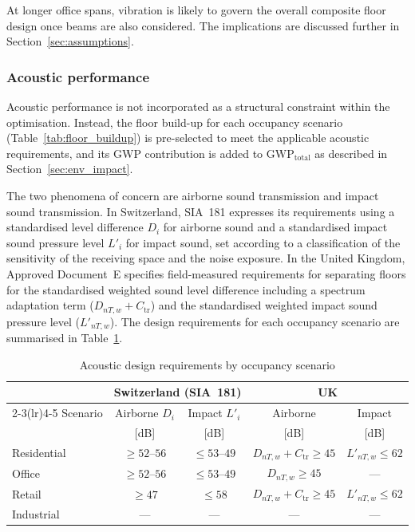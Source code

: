 At longer office spans, vibration is likely to govern the overall composite floor design once beams are also considered. The implications are discussed further in Section~\ref{sec:assumptions}.

\subsubsection*{Acoustic performance}
\label{sec:acoustic}

Acoustic performance is not incorporated as a structural constraint within the optimisation. Instead, the floor build-up for each occupancy scenario (Table~\ref{tab:floor_buildup}) is pre-selected to meet the applicable acoustic requirements, and its GWP contribution is added to $\mathrm{GWP}_\mathrm{total}$ as described in Section~\ref{sec:env_impact}.

The two phenomena of concern are airborne sound transmission and impact sound transmission. In Switzerland, SIA~181 \citep{RefWorks:sia181} expresses its requirements using a standardised level difference $D_i$ for airborne sound and a standardised impact sound pressure level $L'_i$ for impact sound, set according to a classification of the sensitivity of the receiving space and the noise exposure.  In the United Kingdom, Approved Document~E \citep{RefWorks:adePartE} specifies field-measured requirements for separating floors for the standardised weighted sound level difference including a spectrum adaptation term ($D_{nT,w}+C_\mathrm{tr}$) and the standardised weighted impact sound pressure level ($L'_{nT,w}$). The design requirements for each occupancy scenario are summarised in Table~\ref{tab:acoustic_requirements}.

\begin{table}[h!]
\small
\centering
\caption{Acoustic design requirements by occupancy scenario}
\label{tab:acoustic_requirements}
\begin{tabular}{lcccc}
\toprule
 & \multicolumn{2}{c}{\textbf{Switzerland (SIA~181)}} & \multicolumn{2}{c}{\textbf{UK}} \\
\cmidrule(lr){2-3}\cmidrule(lr){4-5}
Scenario & Airborne $D_i$ & Impact $L'_i$ & Airborne & Impact \\
         & [dB] & [dB] & [dB] & [dB] \\
\midrule
Residential & $\ge 52$--$56$ & $\le 53$--$49$ & $D_{nT,w}+C_\mathrm{tr} \ge 45$ & $L'_{nT,w} \le 62$ \\
Office      & $\ge 52$--$56$ & $\le 53$--$49$ & $D_{nT,w} \ge 45$               & --- \\
Retail      & $\ge 47$       & $\le 58$        & $D_{nT,w}+C_\mathrm{tr} \ge 45$ & $L'_{nT,w} \le 62$ \\
Industrial  & ---            & ---             & ---                             & --- \\
\bottomrule
\end{tabular}
\end{table}

